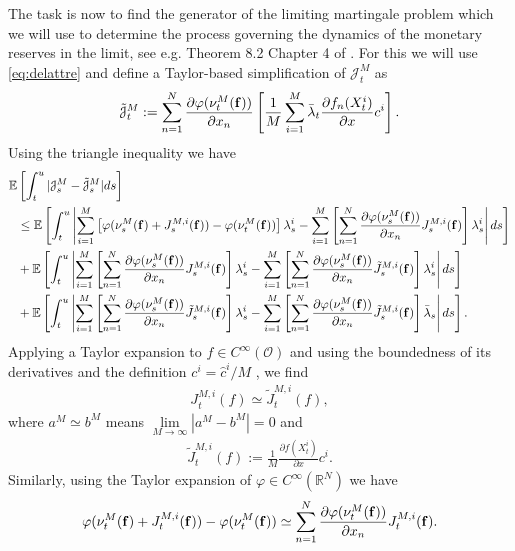 \documentclass[10pt]{article}
\theoremstyle{plain}
\theoremstyle{definition}
\newcommand{\<}{\langle}
\renewcommand{\>}{\rangle}
\renewcommand{\(}{\left(}
\renewcommand{\)}{\right)}
\renewcommand{\[}{\left[}
\renewcommand{\]}{\right]}
\newcommand{\blu}[1]{\textcolor{blue}{#1}}
\def \phi {{\varphi}}
\begin{document}
The task is now to find the generator of the limiting martingale problem which we will use to determine the process governing the dynamics of the monetary reserves in the limit, see e.g. Theorem 8.2 Chapter 4 of \citet{ethier86}. For this we will use \eqref{eq:delattre} and define a Taylor-based simplification of $\mathcal{J}_t^M$ as %
\begin{align}
\mathcal{\tilde J}_t^M:=\sum\limits_{n=1}^N\frac{\partial\phi(\nu_t^M(\bold{f}))}{\partial x_n}
\left[\frac{1}{M}\sum\limits_{i=1}^M\bar\lambda_t\frac{\partial f_n(X_t^i)}{\partial x}c^i
\right].
\end{align}
Using the triangle inequality we have
\begin{align}
\mathbb{E}&\left[\int_t^u|\mathcal{J}_s^{M}-\mathcal{\tilde J}_s^M|ds\right] \label{eq:ineqs}\\
&\leq
\mathbb{E}\left[\int_t^u\left|\sum\limits_{i=1}^M\left[\phi(\nu_s^M(\bold{f})+J_s^{M,i}(\bold{f}))-\phi(\nu_t^M(\bold{f}))\right]\lambda_s^i-\sum\limits_{i=1}^M\left[\sum\limits_{n=1}^N\frac{\partial\phi(\nu_s^M(\bold{f}))}{\partial
x_n}J_s^{M,i}(\bold{f})\right]\lambda_s^i\right|ds\right]\\
&+\mathbb{E}\left[\int_t^u\left|\sum\limits_{i=1}^M\left[\sum\limits_{n=1}^N\frac{\partial\phi(\nu_s^M(\bold{f}))}{\partial
x_n}J_s^{M,i}(\bold{f})\right]\lambda_s^i-
\sum\limits_{i=1}^M\left[\sum\limits_{n=1}^N\frac{\partial\phi(\nu_s^M(\bold{f}))}{\partial
x_n}\tilde J_s^{M,i}(\bold{f})\right]\lambda_s^i \right|ds\right]\\
&+\mathbb{E}\left[\int_t^u\left|\sum\limits_{i=1}^M\left[\sum\limits_{n=1}^N\frac{\partial\phi(\nu_s^M(\bold{f}))}{\partial
x_n}\tilde
J_s^{M,i}(\bold{f})\right]\lambda_s^i-\sum\limits_{i=1}^M\left[\sum\limits_{n=1}^N\frac{\partial\phi(\nu_s^M(\bold{f}))}{\partial
x_n}\tilde J_s^{M,i}(\bold{f})\right]\bar\lambda_s\right|ds\right].
\end{align}
Applying a Taylor expansion to $f\in C^\infty(\mathcal{O})$ and using the boundedness of its derivatives and the definition $c^i =\hat c^i/M$ , we find
\begin{align}\label{eq:boundJ}
J_t^{M,i}(f)\simeq \tilde J_t^{M,i}(f),
\end{align}
 where $a^M \simeq b^M $ means $\lim\limits_{M\rightarrow\infty}|a^M-b^M|=0$ and
\begin{align}
\tilde J_t^{M,i}(f):=\frac{1}{M}\frac{\partial f(X_t^i)}{\partial x}c^i.
\end{align}
Similarly, using the Taylor expansion of $\phi\in C^\infty(\mathbb{R}^N)$ we have  %
\begin{align}\label{eq:boundPhi}
\phi(\nu_t^M(\bold{f})+J_t^{M,i}(\bold{f}))-\phi(\nu_t^M(\bold{f}))\simeq
\sum\limits_{n=1}^N\frac{\partial\phi(\nu_t^M(\bold{f}))}{\partial x_n} J_t^{M,i}(\bold{f}).
\end{align}
\end{document}
